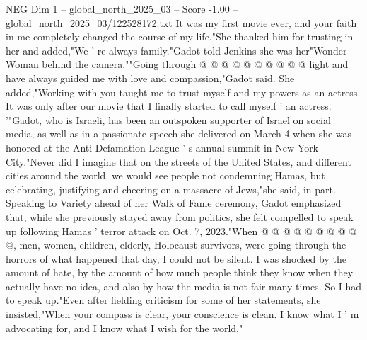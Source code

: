 \begin{textsample}{NEG Dim 1 – global\_north\_2025\_03 – Score -1.00 – global\_north\_2025\_03/122528172.txt}
It was my first movie ever, and your faith in me completely changed the course of my life."She thanked him for trusting in her and added,"We ' re always family."Gadot told Jenkins she was her"Wonder Woman behind the camera.""Going through @ @ @ @ @ @ @ @ @ @ light and have always guided me with love and compassion,"Gadot said.
She added,"Working with you taught me to trust myself and my powers as an actress.
It was only after our movie that I finally started to call myself ' an actress. '"Gadot, who is Israeli, has been an outspoken supporter of Israel on social media, as well as in a passionate speech she delivered on March 4 when she was honored at the Anti-Defamation League ' s annual summit in New York City."Never did I imagine that on the streets of the United States, and different cities around the world, we would see people not condemning Hamas, but celebrating, justifying and cheering on a massacre of Jews,"she said, in part.
Speaking to Variety ahead of her Walk of Fame ceremony, Gadot emphasized that, while she previously stayed away from politics, she felt compelled to speak up following Hamas ' terror attack on Oct. 7, 2023."When @ @ @ @ @ @ @ @ @ @, men, women, children, elderly, Holocaust survivors, were going through the horrors of what happened that day, I could not be silent.
I was shocked by the amount of hate, by the amount of how much people think they know when they actually have no idea, and also by how the media is not fair many times.
So I had to speak up."Even after fielding criticism for some of her statements, she insisted,"When your compass is clear, your conscience is clean.
I know what I ' m advocating for, and I know what I wish for the world."

\end{textsample}
